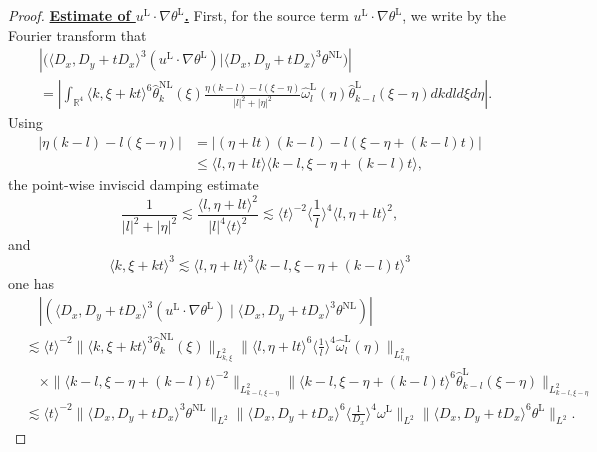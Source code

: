 \documentclass[reqno, 12pt]{amsart} %
\theoremstyle{plain} %
\theoremstyle{definition}
\theoremstyle{remark}
\numberwithin{equation}{section} %
\newcommand{\abs}[1]{\lvert#1\rvert}  %
\begin{document}
\begin{proof}
		\underline{\bf Estimate of $u^{\mathrm{L}} \cdot \nabla \theta^{\mathrm{L}}$.}
		First, for the source term $u^{\mathrm{L}} \cdot \nabla \theta^{\mathrm{L}}$, we write by the Fourier transform that
		\begin{equation*}\begin{aligned}
				&\left|\big(\langle D_x, D_y+t D_x\rangle^3(u^{\mathrm{L}} \cdot \nabla \theta^{\mathrm{L}})  \big| \langle D_x, D_y+t D_x\rangle^3 \theta^{\mathrm{NL}}\big)\right|  \\
				&=\left|\int_{\mathbb{R}^4}\langle k, \xi+k t\rangle^6 \hat{\theta}_k^{\mathrm{NL}}(\xi) \frac{\eta(k-l)-l(\xi-\eta)}{|l|^2+|\eta|^2} \hat{\omega}_l^{\mathrm{L}}(\eta) \hat{\theta}_{k-l}^{\mathrm{L}}(\xi-\eta) d k d l d \xi d \eta\right|.
		\end{aligned}\end{equation*}
		Using
		\begin{equation}
			\begin{aligned} \label{eq:0}
				\abs{\eta(k-l)-l(\xi-\eta)} & = \abs{  (\eta+l t)(k-l)-l(\xi-\eta+(k-l) t)  } \\
				& \leq\langle l, \eta+l t\rangle\langle k-l, \xi-\eta+(k-l) t\rangle,
			\end{aligned}
		\end{equation}
		the point-wise inviscid damping estimate
		\begin{equation} \label{eq:the point-wise inviscid damping estimate}
			\frac{1}{|l|^2+|\eta|^2} \lesssim \frac{\langle l, \eta+l t\rangle^2}{|l|^4\langle t\rangle^2} \lesssim\langle t\rangle^{-2}\langle\frac{1}{l}\rangle^4\langle l, \eta+l t\rangle^2,
		\end{equation}
		and
		\begin{equation} \label{eq:temp.1}
			\langle k, \xi+k t\rangle^3 \lesssim\langle l, \eta+l t\rangle^3\langle k-l, \xi-\eta+(k-l) t\rangle^3
		\end{equation}
		one has 
		\begin{equation}\begin{aligned} \label{eq:est of source term}
				& \quad\left|\left(\langle D_x, D_y+t D_x\rangle^3\left(u^{\mathrm{L}} \cdot \nabla \theta^{\mathrm{L}}\right) \mid\langle D_x, D_y+t D_x\rangle^3 \theta^{\mathrm{NL}}\right)\right| \\
				& \lesssim\langle t\rangle^{-2}\|\langle k, \xi+k t\rangle^3 \hat{\theta}_k^{\mathrm{NL}}(\xi)\|_{L_{k, \xi}^2}\|\langle l, \eta+l t\rangle^6\langle\frac{1}{l}\rangle^4 \hat{\omega}_l^{\mathrm{L}}(\eta)\|_{L_{l, \eta}^2} \\
				& \quad \times\|\langle k-l, \xi-\eta+(k-l) t\rangle^{-2}\|_{L_{k-l, \xi - \eta}^2}\|\langle k-l, \xi-\eta+(k-l) t\rangle^6 \hat{\theta}_{k-l}^{\mathrm{L}}(\xi-\eta)\|_{L_{k-l, \xi - \eta}^2} \\
				& \lesssim\langle t\rangle^{-2}\|\langle D_x, D_y+t D_x\rangle^3 \theta^{\mathrm{NL}}\|_{L^2}\|\langle D_x, D_y+t D_x\rangle^6\langle\frac{1}{D_x}\rangle^4 \omega^{\mathrm{L}}\|_{L^2}\|\langle D_x, D_y+t D_x\rangle^6 \theta^{\mathrm{L}}\|_{L^2} .
		\end{aligned}\end{equation}
		

\end{proof}
\end{document}
